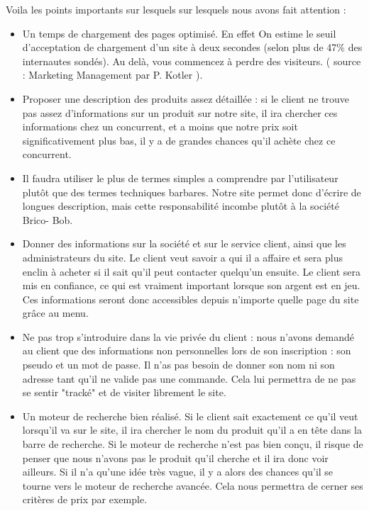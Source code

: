 Voila les points importants sur lesquels sur lesquels nous avons fait attention :
			\begin{itemize}
\item Un temps de chargement des pages optimisé. En effet On estime le seuil d'acceptation de chargement d'un site à deux secondes (selon plus de 47\%  des internautes sondés).  Au delà, vous commencez à perdre des visiteurs. ( source : Marketing Management par  P. Kotler ).\\

\item Proposer une description des produits assez détaillée : si le client ne trouve 	pas 	assez d'informations sur un produit sur notre site, il ira chercher ces 	informations chez un concurrent, et a moins que notre prix soit 	significativement plus bas, il y a de grandes chances qu'il achète chez ce 	concurrent.\\
	
\item Il faudra utiliser le plus de termes simples a comprendre par l'utilisateur plutôt 	que des termes techniques barbares.  Notre site permet donc d'écrire de 	longues description, mais cette responsabilité incombe plutôt à la société Brico-	Bob.\\

\item Donner des informations sur la société et sur le service client, ainsi que les 	administrateurs du site. Le client veut savoir a qui il a affaire et sera plus enclin 	à acheter si il sait qu'il peut contacter quelqu'un ensuite. Le client sera mis en 	confiance, ce qui est vraiment important lorsque son argent est en jeu.\\
	Ces informations seront donc accessibles depuis n'importe quelle page du site 	grâce au menu.\\

\item Ne pas trop s'introduire dans la vie privée du client : nous n'avons demandé 	au client que des informations non personnelles lors de son inscription :  son 	pseudo et un mot de passe. Il n'as pas besoin de donner son nom ni son 	adresse tant qu'il ne valide pas une commande. Cela lui permettra de ne pas se  	sentir "tracké" et de visiter librement le site.\\

\item Un moteur de recherche bien réalisé. Si le client sait exactement ce qu'il veut 	lorsqu'il va sur le site, il ira chercher le nom du produit qu'il a en tête dans la 	barre de recherche. Si le moteur de recherche n'est pas bien conçu, il risque de 	penser que nous n'avons pas le produit qu'il cherche et il ira donc voir ailleurs. 	Si il n'a qu'une idée très vague, il y a alors des chances qu'il se tourne vers le 	moteur de recherche avancée. Cela nous permettra de cerner ses critères de 	prix par exemple.\\


\end{itemize}
